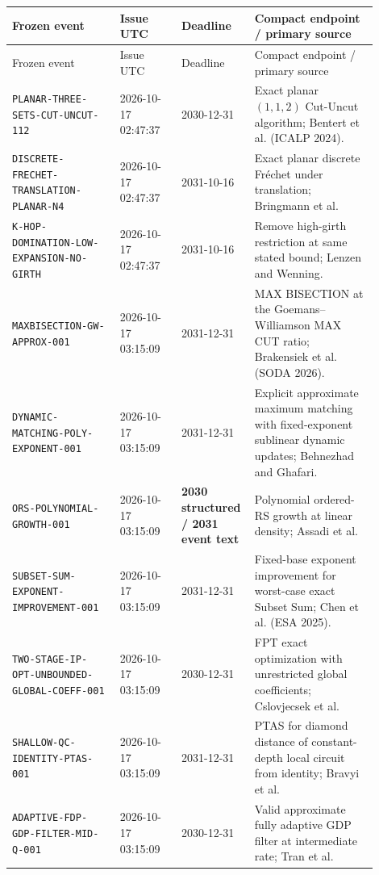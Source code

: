 \documentclass[11pt]{article}
\begin{document}
\begin{longtable}{p{0.28\linewidth}p{0.16\linewidth}p{0.14\linewidth}p{0.32\linewidth}}
\toprule Frozen event & Issue UTC & Deadline & Compact endpoint / primary source \\
\midrule\endfirsthead
\toprule Frozen event & Issue UTC & Deadline & Compact endpoint / primary source \\
\midrule\endhead
\texttt{PLANAR-THREE-SETS-CUT-UNCUT-112} & 2026-10-17 02:47:37 & 2030-12-31 & Exact planar $(1,1,2)$ Cut-Uncut algorithm; Bentert et al. (ICALP 2024). \\
\texttt{DISCRETE-FRECHET-TRANSLATION-PLANAR-N4} & 2026-10-17 02:47:37 & 2031-10-16 & Exact planar discrete Fr\'echet under translation; Bringmann et al. \\
\texttt{K-HOP-DOMINATION-LOW-EXPANSION-NO-GIRTH} & 2026-10-17 02:47:37 & 2031-10-16 & Remove high-girth restriction at same stated bound; Lenzen and Wenning. \\
\texttt{MAXBISECTION-GW-APPROX-001} & 2026-10-17 03:15:09 & 2031-12-31 & MAX BISECTION at the Goemans--Williamson MAX CUT ratio; Brakensiek et al. (SODA 2026). \\
\texttt{DYNAMIC-MATCHING-POLY-EXPONENT-001} & 2026-10-17 03:15:09 & 2031-12-31 & Explicit approximate maximum matching with fixed-exponent sublinear dynamic updates; Behnezhad and Ghafari. \\
\texttt{ORS-POLYNOMIAL-GROWTH-001} & 2026-10-17 03:15:09 & \textbf{2030 structured / 2031 event text} & Polynomial ordered-RS growth at linear density; Assadi et al. \\
\texttt{SUBSET-SUM-EXPONENT-IMPROVEMENT-001} & 2026-10-17 03:15:09 & 2031-12-31 & Fixed-base exponent improvement for worst-case exact Subset Sum; Chen et al. (ESA 2025). \\
\texttt{TWO-STAGE-IP-OPT-UNBOUNDED-GLOBAL-COEFF-001} & 2026-10-17 03:15:09 & 2030-12-31 & FPT exact optimization with unrestricted global coefficients; Cslovjecsek et al. \\
\texttt{SHALLOW-QC-IDENTITY-PTAS-001} & 2026-10-17 03:15:09 & 2031-12-31 & PTAS for diamond distance of constant-depth local circuit from identity; Bravyi et al. \\
\texttt{ADAPTIVE-FDP-GDP-FILTER-MID-Q-001} & 2026-10-17 03:15:09 & 2030-12-31 & Valid approximate fully adaptive GDP filter at intermediate rate; Tran et al. \\
\bottomrule
\end{longtable}
\normalsize
\end{document}
